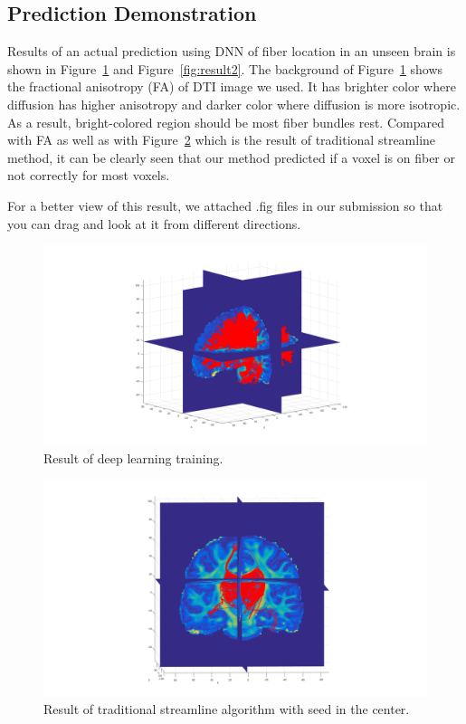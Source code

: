 \documentclass[10pt,twocolumn,letterpaper]{article}
\begin{document}
	\subsection{Prediction Demonstration}
	Results of an actual prediction using DNN of fiber location in an unseen brain is shown in Figure~\ref{fig:result1} and Figure~\ref{fig:result2}. The background of Figure~\ref{fig:result1} shows the fractional anisotropy (FA) of DTI image we used. It has brighter color where diffusion has higher anisotropy and darker color where diffusion is more isotropic. As a result, bright-colored region should be most fiber bundles rest. Compared with FA as well as with Figure~\ref{fig:streamline1} which is the result of traditional streamline method, it can be clearly seen that our method predicted if a voxel is on fiber or not correctly for most voxels.
	
	For a better view of this result, we attached .fig files in our submission so that you can drag and look at it from different directions.
	
	\begin{figure}[t]
		\begin{center}
			\includegraphics[width=1.0\linewidth]{img/1.png}
		\end{center}
		\caption{Result of deep learning training.}
		\label{fig:result1}
	\end{figure}
	
	\begin{figure}[t]
		\begin{center}
			\includegraphics[width=1.0\linewidth]{img/5.png}
		\end{center}
		\caption{Result of traditional streamline algorithm with seed in the center.}
		\label{fig:streamline1}
	\end{figure}
	
\end{document}
